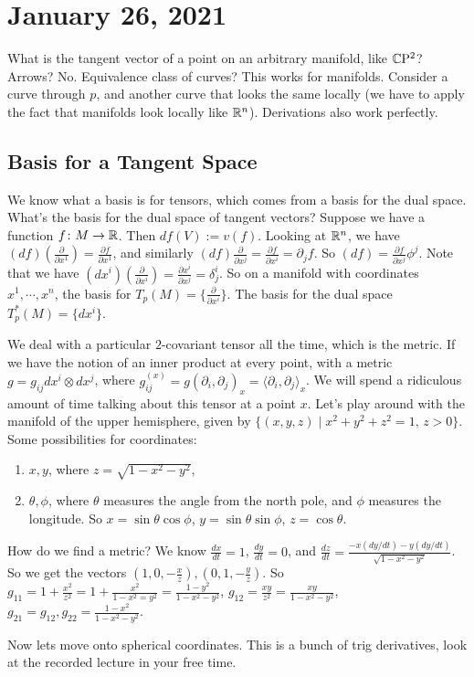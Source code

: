 \section{January 26, 2021}
What is the tangent vector of a point on an arbitrary manifold, like $\mathbb{C} \mathrm P^2$? Arrows? No. Equivalence class of curves? This works for manifolds. Consider a curve through $p$, and another curve that looks the same locally (we have to apply the fact that manifolds look locally like $\mathbb{R}^n $). Derivations also work perfectly.

\subsection{Basis for a Tangent Space}
We know what a basis is for tensors, which comes from a basis for the dual space. What's the basis for the dual space of tangent vectors? Suppose we have a function $f \colon M \to \mathbb{R}$. Then $df (V) := v(f)$. Looking at $\mathbb{R}^n $, we have $(df) \left( \frac{\partial }{\partial x^1} \right) = \frac{\partial f}{\partial x^1}$, and similarly $(df)\frac{\partial }{\partial x^j }= \frac{\partial f}{\partial x^i }=\partial _j f$. So $(df) = \frac{\partial f}{\partial x^j }\phi ^j $. Note that we have $(dx^i ) \left( \frac{\partial }{\partial x^i } \right) = \frac{\partial x^i }{\partial x^j }=\delta ^i _j $. So on a manifold with coordinates $x^1,\cdots , x^n $, the basis for $T_p(M)= \{\frac{\partial }{\partial x^i }\} $. The basis for the dual space $T_p^*(M)= \{dx^i \} $.

We deal with a particular $2$-covariant tensor all the time, which is the metric. If we have the notion of an inner product at every point, with a metric $g= g_{ij}dx^i  \otimes dx^j $, where $g_{ij}^{(x)}=g(\partial _i  , \partial _j )_x= \langle \partial _i , \partial _j  \rangle _x$. We will spend a ridiculous amount of time talking about this tensor at a point $x$. Let's play around with the manifold of the upper hemisphere, given by $\{(x,y,z)  \mid  x^2+y^2+z^2=1, \, z>0\} $. Some possibilities for coordinates:
\begin{enumerate}
    \item $x,y$, where $z= \sqrt{1-x^2-y^2} $,
    \item $\theta, \phi$, where $\theta$ measures the angle from the north pole, and $\phi$ measures the longitude. So $x=\sin \theta \cos \phi$, $y= \sin \theta \sin \phi$, $z = \cos \theta$.
\end{enumerate}
How do we find a metric? We know $\frac{dx}{dt}=1$, $\frac{dy}{dt}=0$, and $\frac{dz}{dt}=\frac{-x (dy /dt)-y(dy /dt)}{\sqrt{1-x^2-y^2} }$. So we get the vectors $(1,0, -\frac{x}{z}), (0,1, -\frac{y}{z})$. So $g_{11}=1+ \frac{x^2}{z^2}=1+ \frac{x^2}{1-x^2=y^2}=\frac{1-y^2}{1-x^2-y^2}$, $g_{12}=\frac{xy}{z^2}=\frac{xy}{1-x^2-y^2}$, $g_{21}=g_{12}, g_{22}=\frac{1-x^2}{1-x^2-y^2}$.

Now lets move onto spherical coordinates. This is a bunch of trig derivatives, look at the recorded lecture in your free time.
